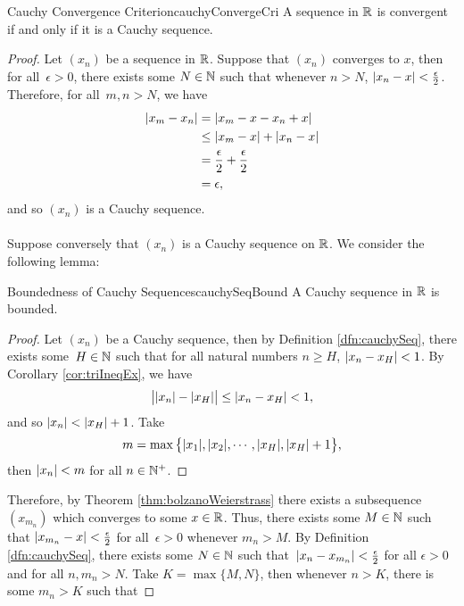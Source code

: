 \documentclass[math]{amznotes}
\theoremstyle{remark}
\begin{document}
\begin{thmbox}{Cauchy Convergence Criterion}{cauchyConvergeCri}
    A sequence in $\mathbb{R}$ is convergent if and only if it is a Cauchy sequence.
    \tcblower
    \begin{proof}
        Let $(x_n)$ be a sequence in $\mathbb{R}$. Suppose that $(x_n)$ converges to $x$, then for all~$\epsilon > 0$, there exists some $N \in \mathbb{N}$ such that whenever $n > N$, ${\left\lvert {x_n - x} \right\rvert} < \frac{\epsilon}{2}$. Therefore, for all~$m, n > N$, we have
        \begin{align*}
            {\left\lvert {x_m - x_n} \right\rvert} & = {\left\lvert {x_m - x - x_n + x} \right\rvert} \\
            & \leq {\left\lvert {x_m - x} \right\rvert} + {\left\lvert {x_n - x} \right\rvert} \\
            & = \frac{\epsilon}{2} + \frac{\epsilon}{2} \\
            & = \epsilon,
        \end{align*}
        and so $(x_n)$ is a Cauchy sequence.
        \\\\
        Suppose conversely that $(x_n)$ is a Cauchy sequence on $\mathbb{R}$. We consider the following lemma:
        \begin{lembox}{Boundedness of Cauchy Sequences}{cauchySeqBound}
            A Cauchy sequence in $\mathbb{R}$ is bounded.
            \tcblower
            \begin{proof}
                Let $(x_n)$ be a Cauchy sequence, then by Definition \ref{dfn:cauchySeq}, there exists some~$H \in \mathbb{N}$ such that for all natural numbers $n \geq H$, ${\left\lvert {x_n - x_H} \right\rvert} < 1$. By Corollary \ref{cor:triIneqEx}, we have
                \begin{equation*}
                    \big\lvert{\left\lvert {x_n} \right\rvert} - {\left\lvert {x_H} \right\rvert}\big\rvert \leq {\left\lvert {x_n - x_H} \right\rvert} < 1,
                \end{equation*}
                and so ${\left\lvert {x_n} \right\rvert} < {\left\lvert {x_H} \right\rvert} + 1$. Take 
                \begin{equation*}
                    m = \max\big\{{\left\lvert {x_1} \right\rvert}, {\left\lvert {x_2} \right\rvert}, \cdots, {\left\lvert {x_H} \right\rvert}, {\left\lvert {x_H} \right\rvert} + 1\big\},
                \end{equation*}
                then ${\left\lvert {x_n} \right\rvert} < m$ for all $n \in \mathbb{N}^+$.
            \end{proof}
        \end{lembox}
        Therefore, by Theorem \ref{thm:bolzanoWeierstrass} there exists a subsequence $\left(x_{m_n}\right)$ which converges to some $x \in \mathbb{R}$. Thus, there exists some $M \in \mathbb{N}$ such that ${\left\lvert {x_{m_n} - x} \right\rvert} < \frac{\epsilon}{2}$ for all~$\epsilon > 0$ whenever $m_{n} > M$. By Definition \ref{dfn:cauchySeq}, there exists some $N \in \mathbb{N}$ such that~${\left\lvert {x_n - x_{m_n}} \right\rvert} < \frac{\epsilon}{2}$ for all $\epsilon > 0$ and for all $n, m_n > N$. Take $K = \max\{M, N\}$, then whenever $n > K$, there is some $m_n > K$ such that

\end{proof}
\end{thmbox}
\end{document}
